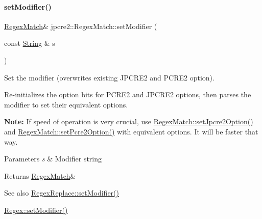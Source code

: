 \paragraph{\texorpdfstring{set\+Modifier()}{setModifier()}}
{\footnotesize\ttfamily \hyperlink{classjpcre2_1_1RegexMatch}{Regex\+Match}\& jpcre2\+::\+Regex\+Match\+::set\+Modifier (\begin{DoxyParamCaption}\item[{const \hyperlink{namespacejpcre2_a91f03070152fb228bc116c5a737f1d16}{String} \&}]{s }\end{DoxyParamCaption})\hspace{0.3cm}{\ttfamily [inline]}}



Set the modifier (overwrites existing J\+P\+C\+R\+E2 and P\+C\+R\+E2 option). 

Re-\/initializes the option bits for P\+C\+R\+E2 and J\+P\+C\+R\+E2 options, then parses the modifier to set their equivalent options.

{\bfseries Note\+:} If speed of operation is very crucial, use \hyperlink{classjpcre2_1_1RegexMatch_a0d76033d9c134caa9ddfc21849603920_a0d76033d9c134caa9ddfc21849603920}{Regex\+Match\+::set\+Jpcre2\+Option()} and \hyperlink{classjpcre2_1_1RegexMatch_ae4ab558c2bec0bc9639dbca70ab47496_ae4ab558c2bec0bc9639dbca70ab47496}{Regex\+Match\+::set\+Pcre2\+Option()} with equivalent options. It will be faster that way. 
\begin{DoxyParams}{Parameters}
{\em s} & Modifier string \\
\hline
\end{DoxyParams}
\begin{DoxyReturn}{Returns}
\hyperlink{classjpcre2_1_1RegexMatch}{Regex\+Match}\& 
\end{DoxyReturn}
\begin{DoxySeeAlso}{See also}
\hyperlink{classjpcre2_1_1RegexReplace_ae2abe2994b0fbe54950f88e63000c910_ae2abe2994b0fbe54950f88e63000c910}{Regex\+Replace\+::set\+Modifier()} 

\hyperlink{classjpcre2_1_1Regex_aed9865b58c60945e19f36fa310f5a595_aed9865b58c60945e19f36fa310f5a595}{Regex\+::set\+Modifier()} 
\end{DoxySeeAlso}
\hypertarget{classjpcre2_1_1RegexMatch_ae495431f57cae54363331237ab21b56c_ae495431f57cae54363331237ab21b56c}{}\label{classjpcre2_1_1RegexMatch_ae495431f57cae54363331237ab21b56c_ae495431f57cae54363331237ab21b56c} 
